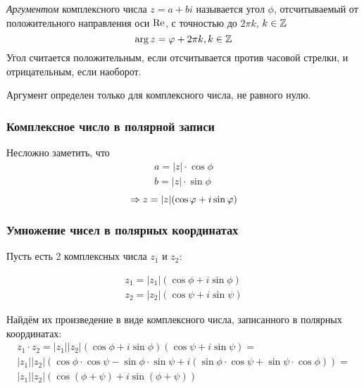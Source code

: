 \begin{definition}
    \textit{Аргументом} комплексного числа $z = a + bi$ называется угол $\phi$, отсчитываемый от положительного направления оси $\operatorname{Re}$, с точностью до $2\pi k$, $k \in \mathbb{Z}$
    $$
        \arg z = \varphi + 2\pi k, k \in \mathbb{Z}
    $$
    Угол считается положительным, если отсчитывается против часовой стрелки, и отрицательным, если наоборот.
\end{definition}

\begin{note}
    Аргумент определен только для комплексного числа, не равного нулю.
\end{note}

\subsubsection*{Комплексное число в полярной записи}

\begin{definition}
    Несложно заметить, что
    \begin{align*}
        a = |z| \cdot \cos \phi \\
        b = |z| \cdot \sin \phi
    \end{align*}
    $$
        \Rightarrow z = |z|(\cos \varphi + i \sin \varphi)
    $$
\end{definition}

\subsubsection*{Умножение чисел в полярных координатах}

Пусть есть 2 комплексных числа $z_1$ и $z_2$:

\begin{align*}
    z_1 = |z_1|(\cos\phi + i \sin\phi)
    \\
    z_2 = |z_2|(\cos\psi + i \sin\psi)
\end{align*}

Найдём их произведение в виде комплексного числа, записанного в полярных координатах:
\begin{multline}
    z_1 \cdot z_2 = |z_1||z_2|(\cos\phi + i \sin\phi)(\cos\psi + i \sin\psi) = \\
    |z_1||z_2|(\cos\phi \cdot \cos\psi - \sin\phi \cdot \sin\psi + i(\sin\phi \cdot \cos\psi + \sin\psi \cdot \cos\phi)) = \\
    |z_1||z_2|(\cos(\phi + \psi) + i \sin(\phi + \psi))
\end{multline}

